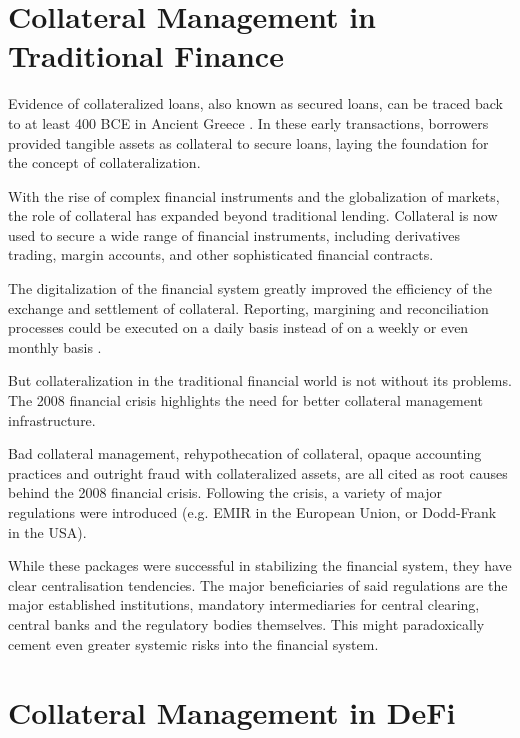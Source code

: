 \documentclass[sigconf,nonacm]{acmart}
\begin{document}
\section{Collateral Management in Traditional Finance}
\label{sec:collateral-managemen-in-traditional-finance}

Evidence of collateralized loans, also known as secured loans, can be traced back to at least 400 BCE in Ancient Greece \cite{millett2002lending}.
In these early transactions, borrowers provided tangible assets as collateral to secure loans, laying the foundation for the concept of collateralization.

With the rise of complex financial instruments and the globalization of markets, the role of collateral has expanded beyond traditional lending.
Collateral is now used to secure a wide range of financial instruments, including derivatives trading, margin accounts,
and other sophisticated financial contracts.

The digitalization of the financial system greatly improved the efficiency of the exchange and settlement of collateral.
Reporting, margining and reconciliation processes could be executed on a daily basis instead of on a weekly or even monthly basis \cite{simmons2019collateral}.

But collateralization in the traditional financial world is not without its problems.
The 2008 financial crisis highlights the need for better collateral management infrastructure.

Bad collateral management, rehypothecation of collateral, opaque accounting practices
and outright fraud with collateralized assets, are all cited as root causes\cite{hellwig2008causes} behind the 2008 financial crisis.
Following the crisis, a variety of major regulations were introduced (e.g. EMIR in the European Union, or Dodd-Frank in the USA).

While these packages were successful in stabilizing the financial system, they have clear centralisation tendencies\cite{gregory2014central}.
The major beneficiaries of said regulations are the major established institutions, mandatory intermediaries for central clearing,
central banks and the regulatory bodies themselves.
This might paradoxically cement even greater systemic risks into the financial system.

\section{Collateral Management in DeFi}
\label{sec:collateral-management-in-DeFi}
\end{document}
